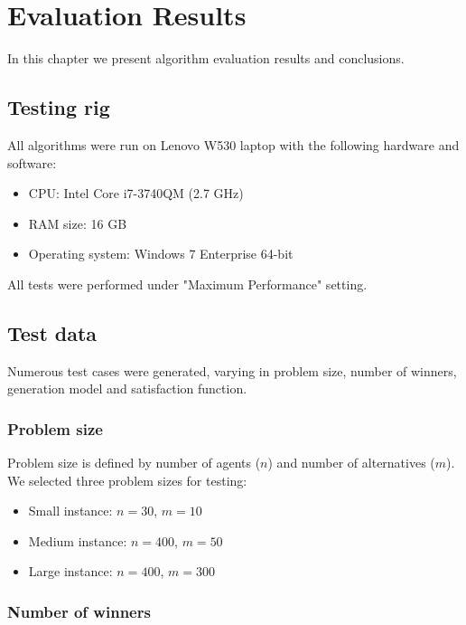 \chapter{Evaluation Results}
\label{cha:evaluationResults}

In this chapter we present algorithm evaluation results and conclusions.

\section{Testing rig}

All algorithms were run on Lenovo W530 laptop with the following hardware and software:

\begin{itemize}
	\item CPU: Intel Core i7-3740QM (2.7 GHz)
	\item RAM size: 16 GB
	\item Operating system: Windows 7 Enterprise 64-bit
\end{itemize}

All tests were performed under "Maximum Performance" setting.

\section{Test data}

Numerous test cases were generated, varying in problem size, number of winners, generation model and satisfaction function.

\subsection{Problem size}

Problem size is defined by number of agents ($n$) and number of alternatives ($m$). We selected three problem sizes for testing:

\begin{itemize}
	\item Small instance: $n = 30$, $m = 10$
	\item Medium instance: $n = 400$, $m = 50$
	\item Large instance: $n = 400$, $m = 300$
\end{itemize}

\subsection{Number of winners}

